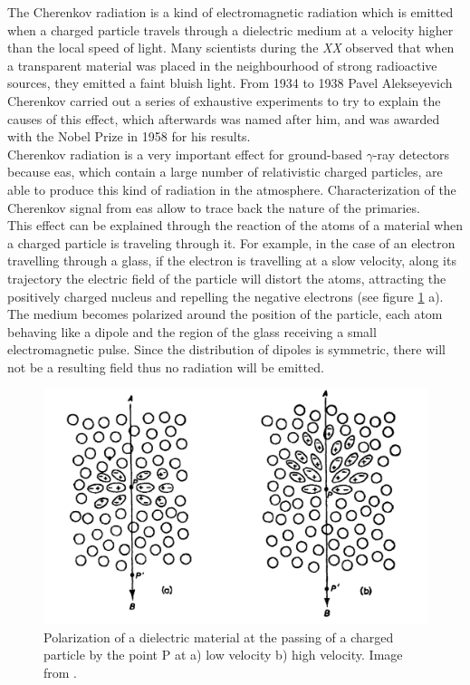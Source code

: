 \documentclass[main.tex]{subfiles}
\begin{document}
The Cherenkov radiation is a kind of electromagnetic radiation which is emitted when a charged particle travels through a dielectric medium at a velocity higher than the local speed of light. Many scientists during the \textit{XX}  observed that when a transparent material was placed in the neighbourhood of strong radioactive sources, they emitted a faint bluish light. From 1934 to 1938 Pavel Alekseyevich Cherenkov carried out a series of exhaustive experiments to try to explain the causes of this effect, which afterwards was named after him, and was awarded with the Nobel Prize in 1958 for his results.\\
Cherenkov radiation is a very important effect for ground-based $\gamma$-ray detectors because \gls{eas}, which contain a large number of relativistic charged particles, are able to produce this kind of radiation in the atmosphere. Characterization of the Cherenkov signal from \gls{eas} allow to trace back the nature of the primaries.\\
This effect can be explained through the reaction of the atoms of a material when a charged particle is traveling through it. For example, in the case of an electron travelling through a glass, if the electron is travelling at a slow velocity, along its trajectory the electric field of the particle will distort the atoms, attracting the positively charged nucleus and repelling the negative electrons (see figure \ref{fig:polarization} a). The medium becomes polarized around the position of the particle, each atom behaving like a dipole and the region of the glass receiving a small electromagnetic pulse. Since the distribution of dipoles  is symmetric, there will not be a resulting field thus no radiation will be emitted.

\begin{figure}
    \centering
    \includegraphics[width=1\textwidth]{Pictures/polarization.pdf}
    \caption{Polarization of a dielectric material at the passing of a charged particle by the point P at a) low velocity b) high velocity. Image from \cite{jelley1958Cherenkov}.}
    \label{fig:polarization}
\end{figure}
\end{document}

